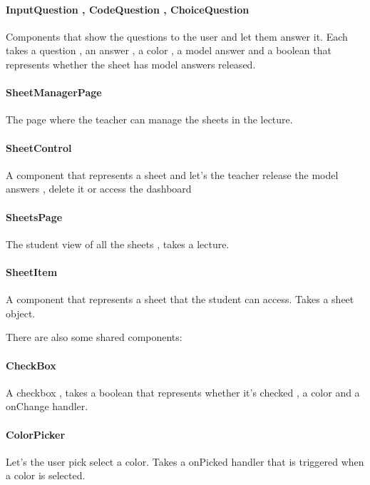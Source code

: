 \paragraph{InputQuestion , CodeQuestion , ChoiceQuestion} Components that show the questions to the user and let them answer it. Each takes a question , an answer , a color , a model answer and a boolean that represents whether the sheet has model answers released.
\paragraph{SheetManagerPage} The page where the teacher can manage the sheets in the lecture.
\paragraph{SheetControl} A component that represents a sheet and let's the teacher release the model answers , delete it or access the dashboard
\paragraph{SheetsPage} The student view of all the sheets , takes a lecture.
\paragraph{SheetItem} A component that represents a sheet that the student can access. Takes a sheet object.

There are also some shared components:

\paragraph{CheckBox} A checkbox , takes a boolean that represents whether it's checked , a color and a onChange handler.
\paragraph{ColorPicker} Let's the user pick select a color. Takes a onPicked handler that is triggered when a color is selected.
